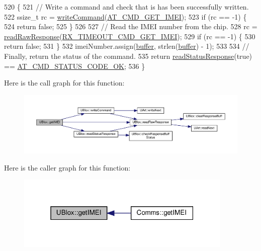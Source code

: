 \begin{DoxyCode}
520 \{
521     \textcolor{comment}{// Write a command and check that is has been successfully written.}
522     ssize\_t rc = \hyperlink{class_u_blox_af604d1897a66192bf1c2a11997f2634d}{writeCommand}(\hyperlink{_u_blox_8cpp_a8589a2182dac88d0193767c584d3fffb}{AT\_CMD\_GET\_IMEI});
523     \textcolor{keywordflow}{if} (rc == -1) \{
524         \textcolor{keywordflow}{return} \textcolor{keyword}{false};
525     \}
526 
527     \textcolor{comment}{// Read the IMEI number from the chip.}
528     rc = \hyperlink{class_u_blox_ab4a7ab4b8922d91e23f273ae160c1bed}{readRawResponse}(\hyperlink{_u_blox_8cpp_aad2fc838c573824893c8fc8893d3e14f}{RX\_TIMEOUT\_CMD\_GET\_IMEI});
529     \textcolor{keywordflow}{if} (rc == -1) \{
530         \textcolor{keywordflow}{return} \textcolor{keyword}{false};
531     \}
532     imeiNumber.assign(\hyperlink{class_u_blox_a6ca4b90f3dc4e856181dce1ebda6f82c}{buffer}, strlen(\hyperlink{class_u_blox_a6ca4b90f3dc4e856181dce1ebda6f82c}{buffer}) - 1);
533 
534     \textcolor{comment}{// Finally, return the status of the command.}
535     \textcolor{keywordflow}{return} \hyperlink{class_u_blox_a4eaca5b1b1c4b5b6f6164b220dd43e0b}{readStatusResponse}(\textcolor{keyword}{true}) == \hyperlink{_u_blox_8cpp_a6ebc1682eb6b9964fccb4a61688ff307}{AT\_CMD\_STATUS\_CODE\_OK};
536 \}
\end{DoxyCode}
Here is the call graph for this function\+:\nopagebreak
\begin{figure}[H]
\begin{center}
\leavevmode
\includegraphics[width=350pt]{da/df6/class_u_blox_ade30654ab2eab43d322dc6b516866401_cgraph}
\end{center}
\end{figure}
Here is the caller graph for this function\+:\nopagebreak
\begin{figure}[H]
\begin{center}
\leavevmode
\includegraphics[width=292pt]{da/df6/class_u_blox_ade30654ab2eab43d322dc6b516866401_icgraph}
\end{center}
\end{figure}
\mbox{\label{class_u_blox_a2443d175bbf55a4f4facc5d8a99d2723}} 
